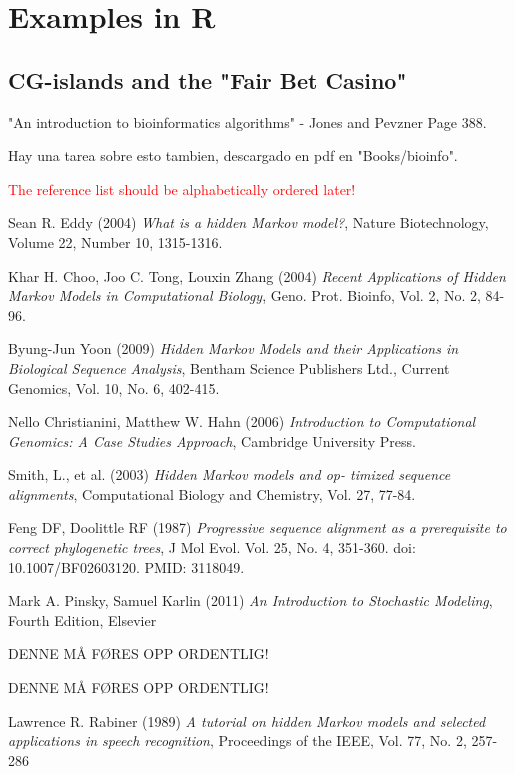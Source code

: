 \documentclass{article}
\begin{document}
\section{Examples in R}

\subsection{CG-islands and the "Fair Bet Casino"}

"An introduction to bioinformatics algorithms" - Jones and Pevzner Page 388. 

Hay una tarea sobre esto tambien, descargado en pdf en "Books/bioinfo".

\textcolor{red}{The reference list should be alphabetically ordered later!}
\begin{thebibliography}{20}
Sean R. Eddy (2004) \emph{What is a hidden Markov model?}, Nature Biotechnology, Volume 22, Number 10, 1315-1316.

Khar H. Choo, Joo C. Tong, Louxin Zhang (2004) \emph{Recent Applications of Hidden Markov Models in Computational Biology}, Geno. Prot. Bioinfo, Vol. 2, No. 2, 84-96.

Byung-Jun Yoon (2009) \emph{Hidden Markov Models and their Applications in Biological Sequence Analysis}, Bentham Science Publishers Ltd., Current Genomics, Vol. 10, No. 6, 402-415.

Nello Christianini, Matthew W. Hahn (2006) \emph{Introduction to Computational Genomics: A Case Studies Approach}, Cambridge University Press.

Smith, L., et al. (2003) \emph{Hidden Markov models and op-
timized sequence alignments}, Computational Biology and Chemistry, Vol. 27, 77-84.

Feng DF, Doolittle RF (1987) \emph{Progressive sequence alignment as a prerequisite to correct phylogenetic trees}, J Mol Evol. Vol. 25, No. 4, 351-360. doi: 10.1007/BF02603120. PMID: 3118049.

Mark A. Pinsky, Samuel Karlin (2011) \emph{An Introduction to Stochastic Modeling}, Fourth Edition, Elsevier

DENNE MÅ FØRES OPP ORDENTLIG!

DENNE MÅ FØRES OPP ORDENTLIG!

Lawrence R. Rabiner (1989) \emph{A tutorial on hidden Markov models and selected applications in speech recognition}, Proceedings of the IEEE, Vol. 77, No. 2, 257-286

\end{thebibliography}
\end{document}
